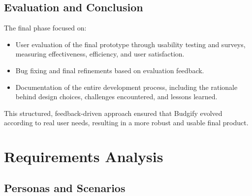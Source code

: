 \documentclass[a4paper,12pt]{article}
\begin{document}
\subsection{Evaluation and Conclusion}
The final phase focused on:
\begin{itemize}
    \item User evaluation of the final prototype through usability testing and surveys, measuring effectiveness, efficiency, and user satisfaction.
    \item Bug fixing and final refinements based on evaluation feedback.
    \item Documentation of the entire development process, including the rationale behind design choices, challenges encountered, and lessons learned.
\end{itemize}
This structured, feedback-driven approach ensured that Budgify evolved according to real user needs, resulting in a more robust and usable final product.
\section{Requirements Analysis}

\subsection{Personas and Scenarios}
\end{document}
